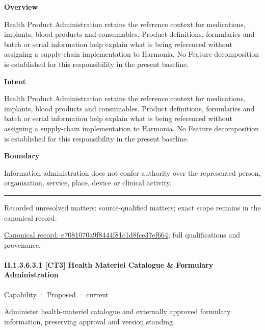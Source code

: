 \textbf{Overview}



Health Product Administration retains the reference context for medications, implants, blood products and consumables. Product definitions, formularies and batch or serial information help explain what is being referenced without assigning a supply-chain implementation to Harmonia. No Feature decomposition is established for this responsibility in the present baseline.



\textbf{Intent}



Health Product Administration retains the reference context for medications, implants, blood products and consumables. Product definitions, formularies and batch or serial information help explain what is being referenced without assigning a supply-chain implementation to Harmonia. No Feature decomposition is established for this responsibility in the present baseline.



\textbf{Boundary}



Information administration does not confer authority over the represented person, organisation, service, place, device or clinical activity.



\medskip\hrule\medskip

{\small Recorded unresolved matters: source-qualified matters; exact scope remains in the canonical record.}\par
{\footnotesize \href{../../../../continuum/strategy/capability/e7081070a9f8444f81c1d8fce37ef664.md}{Canonical record: e7081070a9f8444f81c1d8fce37ef664}; full qualifications and provenance.}\par
\paragraph*{II.1.3.6.3.1 [CT3] Health Materiel Catalogue \& Formulary Administration}
\label{navigation:II.1.3.6.3.1}

\label{element:28b327760af94b8b986357469524d793}
{\small Capability · Proposed · current}\par

Administer health-materiel catalogue and externally approved formulary information, preserving approval and version standing.



